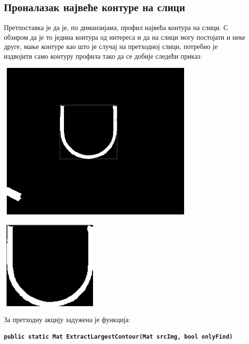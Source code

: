 \documentclass[12pt]{article}
\begin{document}
\subsection{Проналазак највеће контуре на слици}
Претпоставка је да је, по диманзијама, профил највећа контура на слици. С обзиром да је то једина контура од интереса и да на слици могу постојати и неке друге, мање контуре као што је случај на претходној слици, потребно је издвојити само контуру профила тако да се добије следећи приказ:
\vspace{0.5cm}
\begin{center}
    \centering 
    \includegraphics[height=8cm, width=10cm]{images/5_find_largest.png}
\end{center}
\vspace{0.5cm}
\vspace{0.5cm}
\begin{center}
    \centering 
    \includegraphics[height=4.5cm, width=5cm]{images/6_extract_largest.png}
\end{center}
\vspace{0.5cm}
За претходну акцију задужена је функција:
\begin{center}
\texttt{\textbf{public static Mat ExtractLargestContour(Mat srcImg, bool onlyFind)}}
\end{center}
\end{document}
